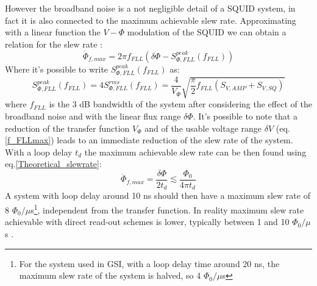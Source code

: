 \documentclass[12pt,a4paper]{report}
\begin{document}
    However the broadband noise is a not negligible detail of a SQUID system, in fact it is also connected to the maximum achievable slew rate. Approximating with a linear function the $V-\Phi$ modulation of the SQUID we can obtain a relation for the slew rate \cite{SQUID_book_2}:
    \begin{equation}
    	\dot{\Phi}_{f,max} = 2\pi f_{FLL} (\delta\Phi - S^{peak}_{\Phi, FLL}(f_{FLL})) 
    \end{equation}
    Where it's possible to write $ S^{peak}_{\Phi, FLL}(f_{FLL})$ as:
    \begin{equation}
    	 S^{peak}_{\Phi, FLL}(f_{FLL}) = 4  S^{rms}_{\Phi, FLL}(f_{FLL}) = \frac{4}{V_{\Phi}}\sqrt{\frac{\pi}{2} f_{FLL} (S_{V,AMP} + S_{V,SQ})}
    \end{equation}
    where $f_{FLL}$ is the 3 dB bandwidth of the system after considering the effect of the broadband noise and with the linear flux range $\delta\Phi$. It's possible to note that a reduction of the transfer function $V_\Phi$ and of the usable voltage range $\delta V$ (eq.\ref{f_FLLmax}) leads to an immediate reduction of the slew rate of the system. With a loop delay $t_d$ the maximum achievable slew rate can be then found using eq.\ref{Theoretical_slewrate}:
    \begin{equation}
	    \dot{\Phi}_{f,max}=\frac{\delta\Phi}{2t_d} \lesssim \frac{\Phi_0}{4\pi t_d}
    \end{equation}
    A system with loop delay around 10 ns should then have a maximum slew rate of 8 $\Phi_0/\mu$s\footnote{For the system used in GSI, with a loop delay time around 20 ns, the maximum slew rate of the system is halved, so 4 $\Phi_0/\mu$s}, independent from the transfer function. In reality maximum slew rate achievable with direct read-out schemes is lower, typically between 1 and 10 $\Phi_0/\mu$s \cite{Squid_handbook_1}.
    \\
\end{document}

